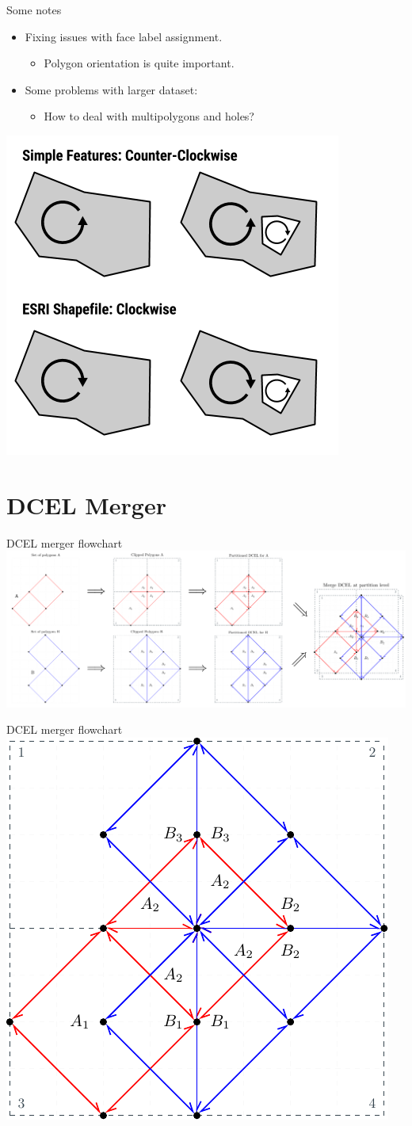 \documentclass{beamer}
\begin{document}
\begin{frame}{Some notes}
    \begin{itemize}
        \item Fixing issues with face label assignment.
        \begin{itemize}
            \item Polygon orientation is quite important.
        \end{itemize}
        \item Some problems with larger dataset:
        \begin{itemize}
            \item How to deal with multipolygons and holes?
        \end{itemize}
    \end{itemize}
    \centering 
    \includegraphics[width=0.4\linewidth]{figures/PolygonOrientation.png} 
\end{frame}

\section{DCEL Merger}
\begin{frame}{DCEL merger flowchart}
    \centering 
    \includegraphics[width=1\linewidth]{figures/OverlayParted} 
\end{frame}

\begin{frame}{DCEL merger flowchart}
    \centering 
    \includegraphics[width=0.5\linewidth]{figures/MergeParts} 
\end{frame}
\end{document}

